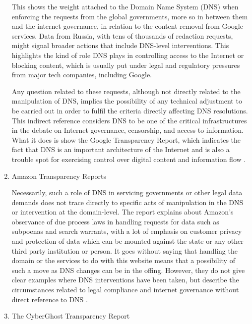\begin{enumerate}
This shows the weight attached to the Domain Name System (DNS) when enforcing the requests from the global governments, more so in between them and the internet governance, in relation to the content removal from Google services. Data from Russia, with tens of thousands of redaction requests, might signal broader actions that include DNS-level interventions. This highlights the kind of role DNS plays in controlling access to the Internet or blocking content, which is usually put under legal and regulatory pressures from major tech companies, including Google.

Any question related to these requests, although not directly related to the manipulation of DNS, implies the possibility of any technical adjustment to be carried out in order to fulfil the criteria directly affecting DNS resolutions. This indirect reference considers DNS to be one of the critical infrastructures in the debate on Internet governance, censorship, and access to information. What it does is show the Google Transparency Report, which indicates the fact that DNS is an important architecture of the Internet and is also a trouble spot for exercising control over digital content and information flow \cite{Google2023}.

\item Amazon Transparency Reports 

Necessarily, such a role of DNS in servicing governments or other legal data demands does not trace directly to specific acts of manipulation in the DNS or intervention at the domain-level. The report explains about Amazon's observance of due process laws in handling requests for data such as subpoenas and search warrants, with a lot of emphasis on customer privacy and protection of data which can be mounted against the state or any other third party institution or person. It goes without saying that handling the domain or the services to do with this website means that a possibility of such a move as DNS changes can be in the offing. However, they do not give clear examples where DNS interventions have been taken, but describe the circumstances related to legal compliance and internet governance without direct reference to DNS \cite{Amazon2023}.

\item The CyberGhost Transparency Report


\end{enumerate}
